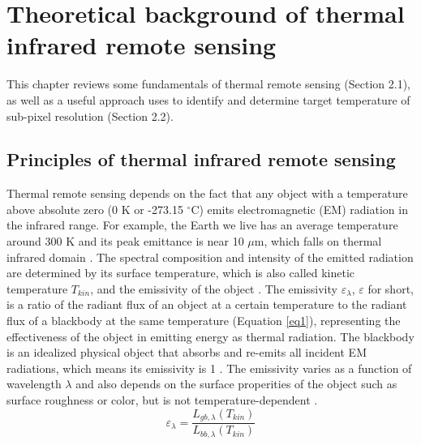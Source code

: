 \chapter{Theoretical background of thermal infrared remote sensing}

\label{Chapter2}

This chapter reviews some fundamentals of thermal remote sensing (Section 2.1), as well as a useful approach uses to identify and determine target temperature of sub-pixel resolution (Section 2.2). \\


\section{Principles of thermal infrared remote sensing}
Thermal remote sensing depends on the fact that any object with a temperature above absolute zero (0 K or -273.15 $^\circ$C) emits electromagnetic (EM) radiation in the infrared range. For example, the Earth we live has an average temperature around 300 K and its peak emittance is near 10 $\mu$m, which falls on thermal infrared domain \parencite {Reference201, Reference202}. The spectral composition and intensity of the emitted radiation are determined by its surface temperature, which is also called kinetic temperature $T_{kin}$,  and the emissivity of the object \parencite{Reference207}. The emissivity $\varepsilon_{\lambda}$, $\varepsilon$ for short, is a ratio of the radiant flux of an object at a certain temperature to the radiant flux of a blackbody at the same temperature (Equation \eqref{eq1}), representing the effectiveness of the object in emitting energy as thermal radiation. The blackbody is an idealized physical object that absorbs and re-emits all incident EM radiations, which means its emissivity is 1 \parencite{Reference206, Reference204}. The emissivity varies as a function of wavelength $\lambda$ and also depends on the surface properities of the object such as surface roughness or color, but is not temperature-dependent \parencite{Reference203}.\\
\begin{equation}
\label{eq1}
\varepsilon_{\lambda} = \frac{L_{gb, \lambda}(T_{kin})}{L_{bb, \lambda}(T_{kin})}
\end{equation}

